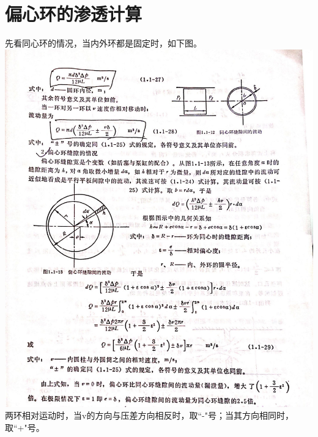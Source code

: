 \documentclass{ctexart}
\begin{document}
\section{偏心环的渗透计算}
先看同心环的情况，当内外环都是固定时，如下图。 \\
\includegraphics[width=\textwidth]{no1.jpg}
两环相对运动时，当v的方向与压差方向相反时，取``-"号；当其方向相同时，取``+"号。
\end{document}
